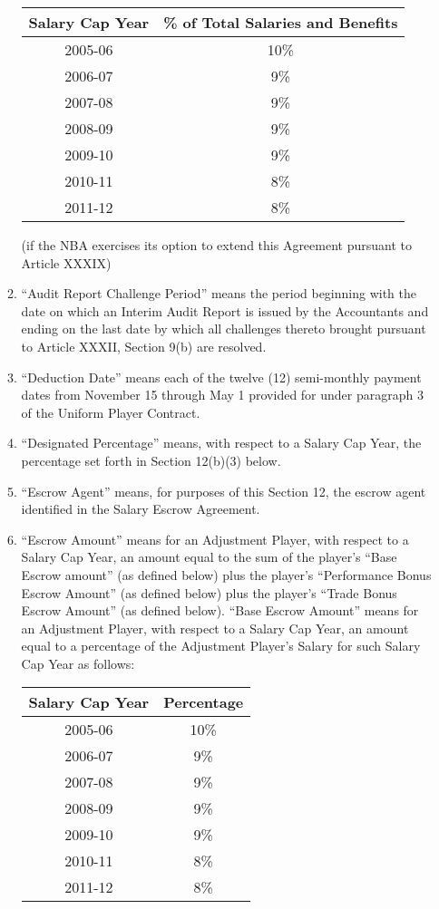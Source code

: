 \documentclass[
]{book}
\begin{document}
\begin{enumerate}
\begin{enumerate}
    \begin{longtable}[]{@{}cc@{}}
    \toprule()
    Salary Cap Year & \% of Total Salaries and Benefits \\
    \midrule()
    \endhead
    2005-06 & 10\% \\
    2006-07 & 9\% \\
    2007-08 & 9\% \\
    2008-09 & 9\% \\
    2009-10 & 9\% \\
    2010-11 & 8\% \\
    2011-12 & 8\% \\
    \bottomrule()
    \end{longtable}

    (if the NBA exercises its option to extend this Agreement pursuant to Article XXXIX)
  \item
    ``Audit Report Challenge Period'' means the period beginning with the date on which an Interim Audit Report is issued by the Accountants and ending on the last date by which all challenges thereto brought pursuant to Article XXXII, Section 9(b) are resolved.
  \item
    ``Deduction Date'' means each of the twelve (12) semi-monthly payment dates from November 15 through May 1 provided for under paragraph 3 of the Uniform Player Contract.
  \item
    ``Designated Percentage'' means, with respect to a Salary Cap Year, the percentage set forth in Section 12(b)(3) below.
  \item
    ``Escrow Agent'' means, for purposes of this Section 12, the escrow agent identified in the Salary Escrow Agreement.
  \item
    ``Escrow Amount'' means for an Adjustment Player, with respect to a Salary Cap Year, an amount equal to the sum of the player's ``Base Escrow amount'' (as defined below) plus the player's ``Performance Bonus Escrow Amount'' (as defined below) plus the player's ``Trade Bonus Escrow Amount'' (as defined below). ``Base Escrow Amount'' means for an Adjustment Player, with respect to a Salary Cap Year, an amount equal to a percentage of the Adjustment Player's Salary for such Salary Cap Year as follows:

    \begin{longtable}[]{@{}cc@{}}
    \toprule()
    Salary Cap Year & Percentage \\
    \midrule()
    \endhead
    2005-06 & 10\% \\
    2006-07 & 9\% \\
    2007-08 & 9\% \\
    2008-09 & 9\% \\
    2009-10 & 9\% \\
    2010-11 & 8\% \\
    2011-12 & 8\% \\
    \bottomrule()
    \end{longtable}


\end{enumerate}
\end{enumerate}
\end{document}
